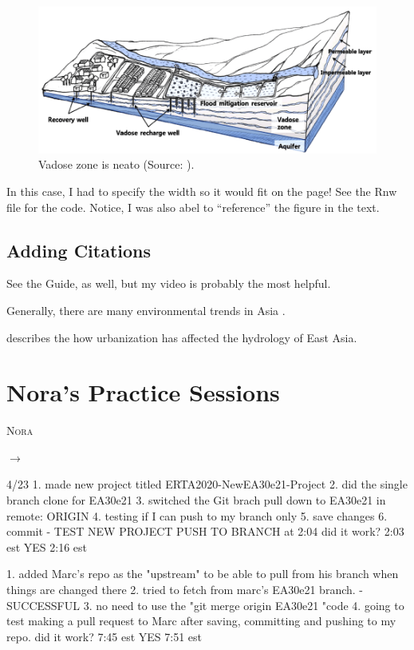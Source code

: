 \documentclass{book}\usepackage{knitr}
\makeatletter
\newcommand{\chapterauthor}[1]{%
  {\parindent0pt\vspace*{-25pt}%
  \linespread{1.1}\large\scshape#1%
  \par\nobreak\vspace*{35pt}}
  \@afterheading%
}
\makeatother
\begin{document}
\begin{figure}
\includegraphics[width=\linewidth]{images/Lee-Vadose}
\caption{Vadose zone is neato (Source: \citet{lee2017fifty}).}
\label{fig:vadose}
\end{figure}

In this case, I had to specify the width so it would fit on the page!  See the Rnw file for the code. Notice, I was also abel to ``reference'' the figure in the text.

\section{Adding Citations}

See the Guide, as well, but my video is probably the most helpful.


Generally, there are many environmental trends in Asia \citep{imura2005urban}.

\citet{imura2005urban} describes the how urbanization has affected the hydrology of East Asia. 
 

\chapter{Nora's Practice Sessions}

\chapterauthor{Nora}

$\rightarrow$

4/23
1. made new project titled ERTA2020-NewEA30e21-Project
2. did the single branch clone for EA30e21
3. switched the Git brach pull down to EA30e21 in remote: ORIGIN
4. testing if I can push to my branch only 
5. save changes
6. commit - TEST NEW PROJECT PUSH TO BRANCH at 2:04
      did it work? 2:03 est
      YES 2:16 est


1. added Marc's repo as the "upstream" to be able to pull from his branch when things are changed there
2. tried to fetch from marc's EA30e21 branch. - SUCCESSFUL
3. no need to use the "git merge origin EA30e21 "code
4. going to test making a pull request to Marc after saving, committing and pushing to my repo. 
    did it work? 7:45 est
    YES 7:51 est
\end{document}
